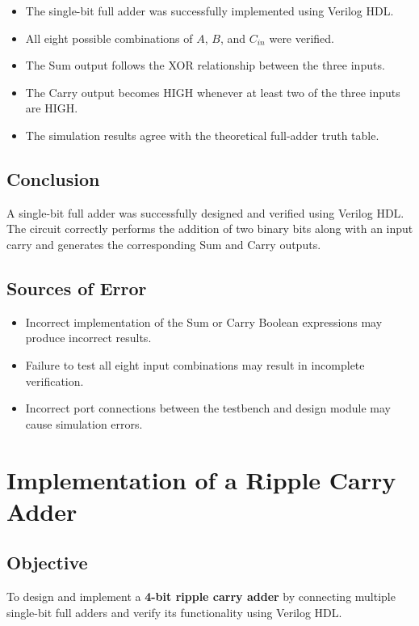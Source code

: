 \documentclass[12pt,a4paper]{report}
\begin{document}
\begin{itemize}
    \item The single-bit full adder was successfully implemented using Verilog HDL.
    \item All eight possible combinations of $A$, $B$, and $C_{in}$ were verified.
    \item The Sum output follows the XOR relationship between the three inputs.
    \item The Carry output becomes HIGH whenever at least two of the three inputs are HIGH.
    \item The simulation results agree with the theoretical full-adder truth table.
\end{itemize}

\section{Conclusion}

A single-bit full adder was successfully designed and verified using Verilog HDL. The circuit correctly performs the addition of two binary bits along with an input carry and generates the corresponding Sum and Carry outputs.

\section{Sources of Error}

\begin{itemize}
    \item Incorrect implementation of the Sum or Carry Boolean expressions may produce incorrect results.
    \item Failure to test all eight input combinations may result in incomplete verification.
    \item Incorrect port connections between the testbench and design module may cause simulation errors.
\end{itemize}


\chapter{Implementation of a Ripple Carry Adder}
\label{ch:pdf4}

\section{Objective}

To design and implement a \textbf{4-bit ripple carry adder} by connecting multiple single-bit full adders and verify its functionality using Verilog HDL.
\end{document}
